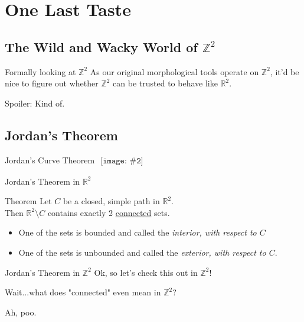 \documentclass{beamer}
\newcommand{\pic}[2]{
     \begin{array}{l}
      \texttt{[image: \#2]}
      \end{array}
}
\newcommand{\integers}{\mathbb{Z}}
\begin{document}
\section{One Last Taste}
\subsection{The Wild and Wacky World of $\integers^2$}
\begin{frame}{Formally looking at $\integers^2$}
  As our original morphological tools operate on $\integers^2$,
  it'd be nice to figure out whether $\integers^2$ can be trusted
  to behave like $\mathbb{R}^2$.

  Spoiler: Kind of. 
\end{frame}

\subsection{Jordan's Theorem}
\begin{frame}{Jordan's Curve Theorem}
  $\pic{width=300pt}{images/jordans_theorem_r2.png}$
\end{frame}

\begin{frame}{Jordan's Theorem in $\mathbb{R}^2$}

\begin{block}{Theorem}
  Let $C$ be a closed, simple path in $\mathbb{R}^2$.\\
  Then $\mathbb{R}^2 \setminus C$ contains exactly 2 \underline{connected}
  sets.
  \begin{itemize}
     \item One of the sets is bounded and called the \emph{interior, with 
           respect to $C$}
     \item One of the sets is unbounded and called the \emph{exterior,
           with respect to $C$}.
  \end{itemize}
\end{block}
\end{frame}

\begin{frame}{Jordan's Theorem in $\integers^2$}
  Ok, so let's check this out in $\integers^2$!

  \pause

  Wait...what does "connected" even mean in $\integers^2$?

  Ah, poo.
\end{frame}
\end{document}
